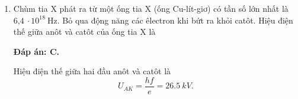 \begin{enumerate}[label=\bfseries Câu \arabic*:]
{	}
	
	\item {}
	\cauhoi
	{Chùm tia X phát ra từ một ống tia X (ống Cu-lít-giơ) có tần số lớn nhất là  $\text{6,4}\ \cdot 10^{18}\ \text{Hz}$. Bỏ qua động năng các êlectron khi bứt ra khỏi catôt. Hiệu điện thế giữa anôt và catôt của ống tia X là
	}
	
	\loigiai
	{		\textbf{Đáp án: C.}
		
Hiệu điện thế giữa hai đầu anôt và catôt là
$$
	U_{AK} = \dfrac{hf}{e} = \SI{26,5}{kV}.
$$
		
	}
	
\end{enumerate}

